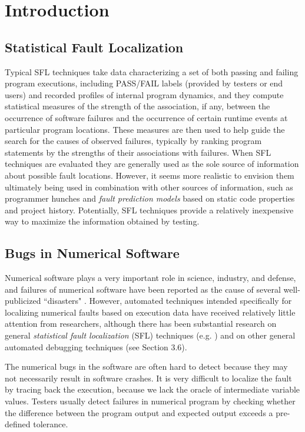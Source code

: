 \chapter{Introduction}\label{chap:introduction}
\section{Statistical Fault Localization}
Typical SFL techniques take data characterizing a set of both passing and failing program executions, including PASS/FAIL labels (provided by testers or end users) and recorded profiles of internal program dynamics, and they compute statistical measures of the strength of the association, if any, between the occurrence of software failures and the occurrence of certain runtime events at particular program locations.  These measures are then used to help guide the search for the causes of observed failures, typically by ranking program statements by the strengths of their associations with failures.  When SFL techniques are evaluated they are generally used as the sole source of information about possible fault locations.  However, it seems more realistic to envision them ultimately being used in combination with other sources of information, such as programmer hunches and {\it fault prediction models} \cite{Fenton1999} based on static code properties and project history.  Potentially, SFL techniques provide a relatively inexpensive way to maximize the information obtained by testing.


\section{Bugs in Numerical Software}
Numerical software plays a very important role in science, industry, and defense, and failures of numerical software have been reported as the cause of several well-publicized ``disasters" \cite{VuikWeb,Kanewala2014}.  However, automated techniques intended specifically for localizing numerical faults based on execution data have received relatively little attention from researchers, although there has been substantial research on general {\it statistical fault localization} (SFL) techniques (e.g. \cite{Jones2002,Liblit2004,Liu2005}) and on other general automated debugging techniques (see Section 3.6).

The numerical bugs in the software are often hard to detect because they may not necessarily result in software crashes. It is very difficult to localize the fault by tracing back the execution, because we lack the oracle of intermediate variable values. Testers usually detect failures in numerical program by checking whether the difference between the program output and expected output exceeds a pre-defined tolerance.

